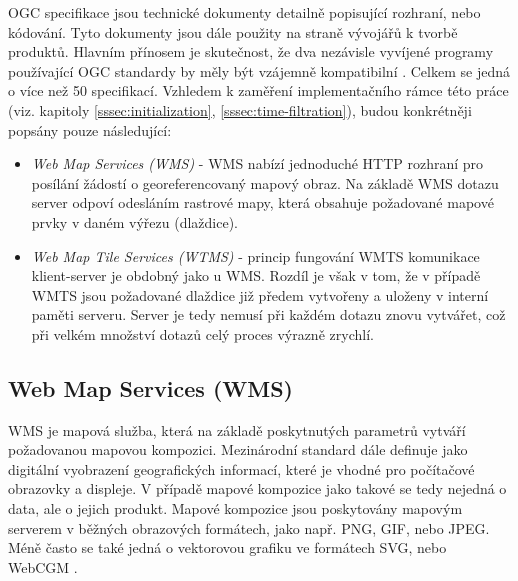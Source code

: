 OGC specifikace jsou technické dokumenty detailně popisující rozhraní,
nebo kódování. Tyto dokumenty jsou dále použity na straně vývojářů k
tvorbě produktů. Hlavním přínosem je skutečnost, že dva nezávisle
vyvíjené programy používající OGC standardy by měly být vzájemně
kompatibilní \cite{oqc_web}. Celkem se jedná o více než 50
specifikací. Vzhledem k zaměření implementačního rámce této práce (viz. kapitoly \ref{sssec:initialization}, \ref{sssec:time-filtration}), budou konkrétněji popsány pouze následující:

\newpage
\begin{itemize}
\item\textit{Web Map Services (WMS)} - WMS nabízí jednoduché HTTP
  rozhraní pro posílání žádostí o georeferencovaný mapový obraz. Na
  základě WMS dotazu server odpoví odesláním rastrové mapy, která
  obsahuje požadované mapové prvky v daném výřezu (dlaždice).
	 
\item\textit{Web Map Tile Services (WTMS)} - princip fungování WMTS
  komunikace klient-server je obdobný jako u WMS. Rozdíl je však v
  tom, že v případě WMTS jsou požadované dlaždice již předem vytvořeny a uloženy
  v interní paměti serveru. Server je tedy nemusí při každém dotazu
  znovu vytvářet, což při velkém množství dotazů celý proces
  výrazně zrychlí.
\end{itemize}

\subsection{Web Map Services (WMS)}

WMS je mapová služba, která na základě poskytnutých
parametrů vytváří požadovanou mapovou kompozici. Mezinárodní standard dále
definuje  jako digitální vyobrazení geografických informací,
které je vhodné pro počítačové obrazovky a displeje. V případě mapové kompozice
jako takové se tedy nejedná o data, ale o jejich produkt. Mapové kompozice 
jsou poskytovány mapovým serverem v běžných obrazových formátech, jako
např. PNG, GIF, nebo JPEG. Méně často se také jedná o vektorovou
grafiku ve formátech SVG, nebo WebCGM \cite{oqc_wms}.


